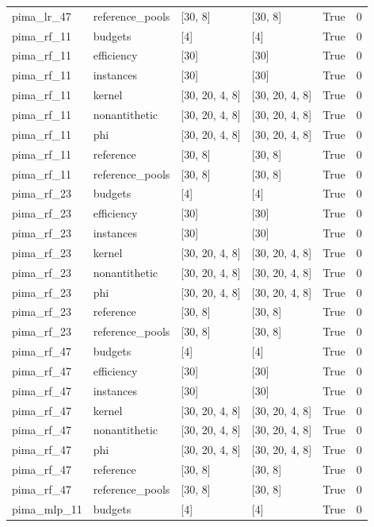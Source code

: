 \begin{tabular}{llllll}
pima\_lr\_47 & reference\_pools & [30, 8] & [30, 8] & True & 0 \\
pima\_rf\_11 & budgets & [4] & [4] & True & 0 \\
pima\_rf\_11 & efficiency & [30] & [30] & True & 0 \\
pima\_rf\_11 & instances & [30] & [30] & True & 0 \\
pima\_rf\_11 & kernel & [30, 20, 4, 8] & [30, 20, 4, 8] & True & 0 \\
pima\_rf\_11 & nonantithetic & [30, 20, 4, 8] & [30, 20, 4, 8] & True & 0 \\
pima\_rf\_11 & phi & [30, 20, 4, 8] & [30, 20, 4, 8] & True & 0 \\
pima\_rf\_11 & reference & [30, 8] & [30, 8] & True & 0 \\
pima\_rf\_11 & reference\_pools & [30, 8] & [30, 8] & True & 0 \\
pima\_rf\_23 & budgets & [4] & [4] & True & 0 \\
pima\_rf\_23 & efficiency & [30] & [30] & True & 0 \\
pima\_rf\_23 & instances & [30] & [30] & True & 0 \\
pima\_rf\_23 & kernel & [30, 20, 4, 8] & [30, 20, 4, 8] & True & 0 \\
pima\_rf\_23 & nonantithetic & [30, 20, 4, 8] & [30, 20, 4, 8] & True & 0 \\
pima\_rf\_23 & phi & [30, 20, 4, 8] & [30, 20, 4, 8] & True & 0 \\
pima\_rf\_23 & reference & [30, 8] & [30, 8] & True & 0 \\
pima\_rf\_23 & reference\_pools & [30, 8] & [30, 8] & True & 0 \\
pima\_rf\_47 & budgets & [4] & [4] & True & 0 \\
pima\_rf\_47 & efficiency & [30] & [30] & True & 0 \\
pima\_rf\_47 & instances & [30] & [30] & True & 0 \\
pima\_rf\_47 & kernel & [30, 20, 4, 8] & [30, 20, 4, 8] & True & 0 \\
pima\_rf\_47 & nonantithetic & [30, 20, 4, 8] & [30, 20, 4, 8] & True & 0 \\
pima\_rf\_47 & phi & [30, 20, 4, 8] & [30, 20, 4, 8] & True & 0 \\
pima\_rf\_47 & reference & [30, 8] & [30, 8] & True & 0 \\
pima\_rf\_47 & reference\_pools & [30, 8] & [30, 8] & True & 0 \\
pima\_mlp\_11 & budgets & [4] & [4] & True & 0 \\

\end{tabular}
